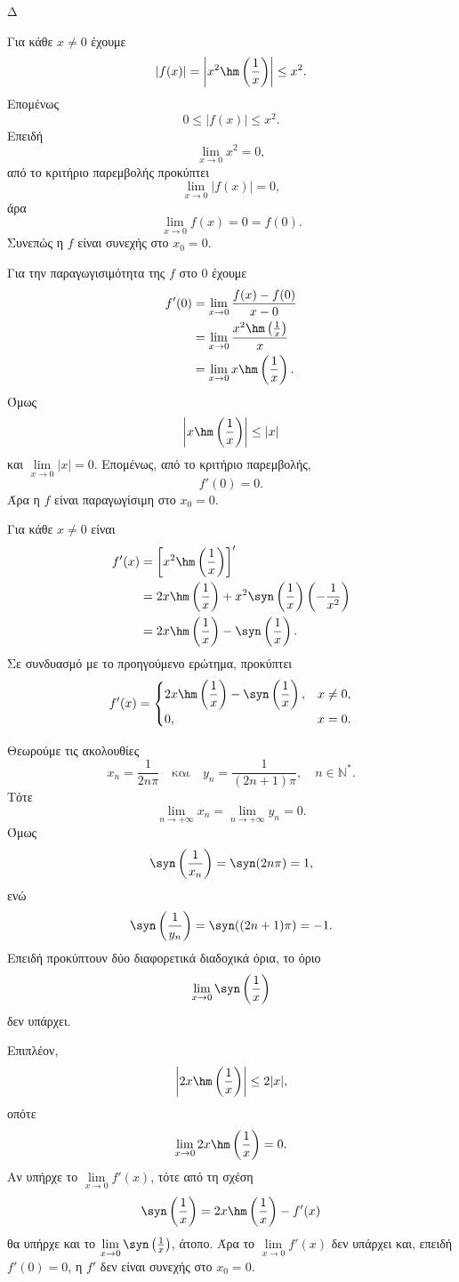\begin{thema}{Δ}
\begin{erwthma}
\item Για κάθε $x\neq0$ έχουμε
\[
\left|f(x)\right|
=\left|x^2\hm\left(\frac{1}{x}\right)\right|
\leq x^2.
\]
Επομένως
\[
0\leq|f(x)|\leq x^2.
\]
Επειδή
\[
\lim_{x\to0}x^2=0,
\]
από το κριτήριο παρεμβολής προκύπτει
\[
\lim_{x\to0}|f(x)|=0,
\]
άρα
\[
\lim_{x\to0}f(x)=0=f(0).
\]
Συνεπώς η $f$ είναι συνεχής στο $x_0=0$.

Για την παραγωγισιμότητα της $f$ στο $0$ έχουμε
\begin{align*}
f'(0)
&=\lim_{x\to0}\frac{f(x)-f(0)}{x-0}\\
&=\lim_{x\to0}\frac{x^2\hm\left(\frac{1}{x}\right)}{x}\\
&=\lim_{x\to0}x\hm\left(\frac{1}{x}\right).
\end{align*}
Όμως
\[
\left|x\hm\left(\frac{1}{x}\right)\right|\leq|x|
\]
και $\lim\limits_{x\to0}|x|=0$. Επομένως, από το κριτήριο παρεμβολής,
\[
{f'(0)=0}.
\]
Άρα η $f$ είναι παραγωγίσιμη στο $x_0=0$.

\item Για κάθε $x\neq0$ είναι
\begin{align*}
f'(x)
&=\left[x^2\hm\left(\frac{1}{x}\right)\right]'\\
&=2x\hm\left(\frac{1}{x}\right)
+x^2\syn\left(\frac{1}{x}\right)
\left(-\frac{1}{x^2}\right)\\
&=2x\hm\left(\frac{1}{x}\right)
-\syn\left(\frac{1}{x}\right).
\end{align*}
Σε συνδυασμό με το προηγούμενο ερώτημα, προκύπτει
\[
{
f'(x)=
\begin{cases}
2x\hm\left(\dfrac{1}{x}\right)-\syn\left(\dfrac{1}{x}\right),
&x\neq0,\\[2mm]
0,&x=0.
\end{cases}}
\]

\item Θεωρούμε τις ακολουθίες
\[
x_n=\frac{1}{2n\pi}
\quad\text{και}\quad
y_n=\frac{1}{(2n+1)\pi},
\quad n\in\mathbb{N}^*.
\]
Τότε
\[
\lim_{n\to+\infty}x_n
=\lim_{n\to+\infty}y_n
=0.
\]
Όμως
\[
\syn\left(\frac{1}{x_n}\right)
=\syn(2n\pi)
=1,
\]
ενώ
\[
\syn\left(\frac{1}{y_n}\right)
=\syn((2n+1)\pi)
=-1.
\]
Επειδή προκύπτουν δύο διαφορετικά διαδοχικά όρια, το όριο
\[
{\lim_{x\to0}\syn\left(\frac{1}{x}\right)}
\]
δεν υπάρχει.

Επιπλέον,
\[
\left|2x\hm\left(\frac{1}{x}\right)\right|\leq2|x|,
\]
οπότε
\[
\lim_{x\to0}2x\hm\left(\frac{1}{x}\right)=0.
\]
Αν υπήρχε το $\lim\limits_{x\to0}f'(x)$, τότε από τη σχέση
\[
\syn\left(\frac{1}{x}\right)
=2x\hm\left(\frac{1}{x}\right)-f'(x)
\]
θα υπήρχε και το $\lim\limits_{x\to0}\syn\left(\frac{1}{x}\right)$, άτοπο. Άρα το $\lim\limits_{x\to0}f'(x)$ δεν υπάρχει και, επειδή $f'(0)=0$, η $f'$ δεν είναι συνεχής στο $x_0=0$.


\end{erwthma}
\end{thema}
